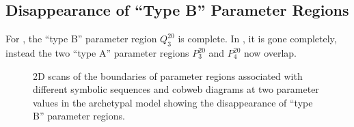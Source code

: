 \subsection{Disappearance of ``Type B'' Parameter Regions}
\label{sec:add.change.disb}

For , the ``type B'' parameter region $Q^{20}_3$ is complete.
In , it is gone completely, instead the two ``type A'' parameter regions $P^{20}_3$ and $P^{20}_4$ now overlap.

\begin{figure}
	\centering
	\caption[2D scans of the boundaries of parameter regions associated with different symbolic sequences and cobweb diagrams at two parameter values in the archetypal model showing the disappearance of ``type B'' parameter regions]{
		2D scans of the boundaries of parameter regions associated with different symbolic sequences and cobweb diagrams at two parameter values in the archetypal model showing the disappearance of ``type B'' parameter regions.
}
\end{figure}
